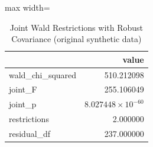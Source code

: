 \begin{table}[htbp]
\centering
\caption{Joint Wald Restrictions with Robust Covariance (original synthetic data)}
\begingroup
\small
\setlength{\tabcolsep}{6pt}
\renewcommand{\arraystretch}{1.12}
\begin{adjustbox}{max width=\linewidth}
\begin{tabular}{@{}lr@{}}
\toprule
 & value \\
\midrule
wald\_chi\_squared & 510.212098 \\
joint\_F & 255.106049 \\
joint\_p & $8.027448 \times 10^{-60}$ \\
restrictions & 2.000000 \\
residual\_df & 237.000000 \\
\bottomrule
\end{tabular}
\end{adjustbox}
\endgroup
\end{table}